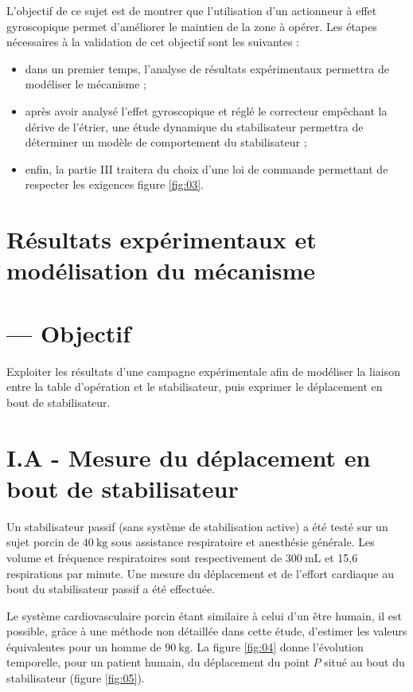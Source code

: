 \begin{obj}
L'objectif de ce sujet est de montrer que l'utilisation d'un actionneur à effet gyroscopique permet d'améliorer le maintien de la zone à opérer. Les étapes nécessaires à la validation de cet objectif sont les suivantes :
\end{obj}

\begin{itemize}
  \item dans un premier temps, l'analyse de résultats expérimentaux permettra de modéliser le mécanisme ;

  \item après avoir analysé l'effet gyroscopique et réglé le correcteur empêchant la dérive de l'étrier, une étude dynamique du stabilisateur permettra de déterminer un modèle de comportement du stabilisateur ;

  \item enfin, la partie III traitera du choix d'une loi de commande permettant de respecter les exigences figure \ref{fig:03}.

\end{itemize}

\section{Résultats expérimentaux et modélisation du mécanisme}
\section{— Objectif}
Exploiter les résultats d'une campagne expérimentale afin de modéliser la liaison entre la table d'opération et le stabilisateur, puis exprimer le déplacement en bout de stabilisateur.

\section{I.A - Mesure du déplacement en bout de stabilisateur}
Un stabilisateur passif (sans système de stabilisation active) a été testé sur un sujet porcin de $40 \mathrm{~kg}$ sous assistance respiratoire et anesthésie générale. Les volume et fréquence respiratoires sont respectivement de $300 \mathrm{~mL}$ et 15,6 respirations par minute. Une mesure du déplacement et de l'effort cardiaque au bout du stabilisateur passif a été effectuée.

Le système cardiovasculaire porcin étant similaire à celui d'un être humain, il est possible, grâce à une méthode non détaillée dans cette étude, d'estimer les valeurs équivalentes pour un homme de $90 \mathrm{~kg}$. La figure \ref{fig:04} donne l'évolution temporelle, pour un patient humain, du déplacement du point $P$ situé au bout du stabilisateur (figure \ref{fig:05}).

